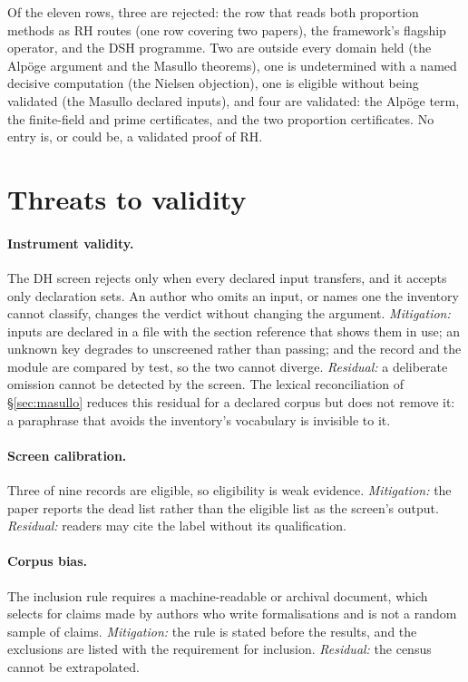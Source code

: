 \documentclass[11pt,a4paper]{article}
\newcommand{\RH}{\mathrm{RH}}
\newcommand{\verdict}[1]{\textsf{#1}}
\begin{document}
Of the eleven rows, three are rejected: the row that reads both proportion methods as $\RH$ routes
(one row covering two papers), the framework's flagship operator, and the DSH programme. Two are
outside every domain held (the Alp\"oge argument and the Masullo theorems), one is undetermined
with a named decisive computation (the Nielsen objection), one is eligible without being validated
(the Masullo declared inputs), and four are validated: the Alp\"oge term, the finite-field and
prime certificates, and the two proportion certificates. No entry is, or could be, a validated
proof of $\RH$.

\section{Threats to validity}

\paragraph{Instrument validity.} The DH screen rejects only when every declared input
transfers, and it accepts only declaration sets. An author who omits an input, or names one the
inventory cannot classify, changes the verdict without changing the argument. \emph{Mitigation:}
inputs are declared in a file with the section reference that shows them in use; an unknown key
degrades to \verdict{unscreened} rather than passing; and the record and the module are compared by
test, so the two cannot diverge. \emph{Residual:} a deliberate omission cannot be detected by the
screen. The lexical reconciliation of \S\ref{sec:masullo} reduces this residual for a declared
corpus but does not remove it: a paraphrase that avoids the inventory's vocabulary is invisible to
it.

\paragraph{Screen calibration.} Three of nine records are eligible, so eligibility is weak
evidence. \emph{Mitigation:} the paper reports the dead list rather than the eligible list as the
screen's output. \emph{Residual:} readers may cite the label without its qualification.

\paragraph{Corpus bias.} The inclusion rule requires a machine-readable or archival
document, which selects for claims made by authors who write formalisations and is not a random
sample of claims. \emph{Mitigation:} the rule is stated before the results, and the exclusions are
listed with the requirement for inclusion. \emph{Residual:} the census cannot be extrapolated.
\end{document}
